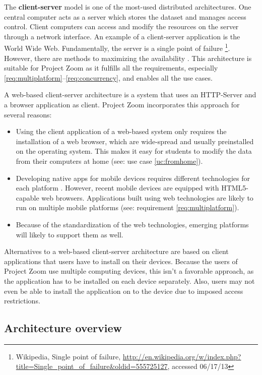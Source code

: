 The \textbf{client-server} \cite{Berson_1996} model is one of the most-used distributed architectures. One central computer acts as a server which stores the dataset and manages access control. Client computers can access and modify the resources on the server through a network interface. An example of a client-server application is the World Wide Web. Fundamentally, the server is a single point of failure \footnote{Wikipedia, Single point of failure, \url{http://en.wikipedia.org/w/index.php?title=Single_point_of_failure&oldid=555725127}, accessed 06/17/13}. However, there are methods to maximizing the availability \cite{Gray_1991} \cite{Colyer_2000}. This architecture is suitable for Project Zoom as it fulfills all the requirements, especially \ref{req:multiplatform}–\ref{req:concurrency}, and enables all the use cases.

A web-based client-server architecture is a system that uses an HTTP-Server \cite{RFC2616} and a browser application as client. Project Zoom incorporates this approach for several reasons:
\begin{itemize}
\item Using the client application of a web-based system only requires the installation of a web browser, which are wide-spread and usually preinstalled on the operating system. This makes it easy for students to modify the data from their computers at home (see: use case \ref{uc:fromhome}).
\item Developing native apps for mobile devices requires different technologies for each platform \cite{Charland_2011}. However, recent mobile devices are equipped with HTML5-capable \cite{W3C_HTML5} web browsers. Applications built using web technologies are likely to run on multiple mobile platforms (see: requirement \ref{req:multiplatform}).
\item Because of the standardization of the web technologies, emerging platforms will likely to support them as well.
\end{itemize}

Alternatives to a web-based client-server architecture are based on client applications that users have to install on their devices. Because the users of Project Zoom use multiple computing devices, this isn't a favorable approach, as the application has to be installed on each device separately. Also, users may not even be able to install the application on to the device due to imposed access restrictions.

\subsection{Architecture overview}

